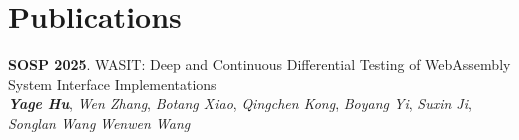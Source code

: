 \section{Publications}

\textbf{SOSP 2025}.
WASIT: Deep and Continuous Differential Testing of WebAssembly System Interface Implementations \\
\footnotesize
\textbf{\textit{Yage Hu}},
\textit{Wen Zhang},
\textit{Botang Xiao},
\textit{Qingchen Kong},
\textit{Boyang Yi},
\textit{Suxin Ji},
\textit{Songlan Wang}
\textit{Wenwen Wang}
